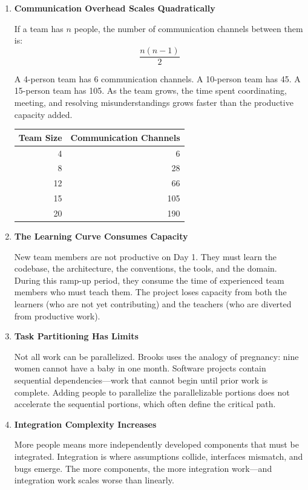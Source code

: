 \documentclass[11pt, letterpaper]{article}
\begin{document}
\begin{enumerate}
    \item \textbf{Communication Overhead Scales Quadratically}
    
    If a team has $n$ people, the number of communication channels between them is:
    \[
    \frac{n(n-1)}{2}
    \]
    
    A 4-person team has 6 communication channels. A 10-person team has 45. A 15-person team has 105. As the team grows, the time spent coordinating, meeting, and resolving misunderstandings grows faster than the productive capacity added.
    
    \begin{center}
    \begin{tabular}{rr}
    \toprule
    \textbf{Team Size} & \textbf{Communication Channels} \\
    \midrule
    4 & 6 \\
    8 & 28 \\
    12 & 66 \\
    15 & 105 \\
    20 & 190 \\
    \bottomrule
    \end{tabular}
    \end{center}
    
    \item \textbf{The Learning Curve Consumes Capacity}
    
    New team members are not productive on Day 1. They must learn the codebase, the architecture, the conventions, the tools, and the domain. During this ramp-up period, they consume the time of experienced team members who must teach them. The project loses capacity from both the learners (who are not yet contributing) and the teachers (who are diverted from productive work).
    
    \item \textbf{Task Partitioning Has Limits}
    
    Not all work can be parallelized. Brooks uses the analogy of pregnancy: nine women cannot have a baby in one month. Software projects contain sequential dependencies---work that cannot begin until prior work is complete. Adding people to parallelize the parallelizable portions does not accelerate the sequential portions, which often define the critical path.
    
    \item \textbf{Integration Complexity Increases}
    
    More people means more independently developed components that must be integrated. Integration is where assumptions collide, interfaces mismatch, and bugs emerge. The more components, the more integration work---and integration work scales worse than linearly.
\end{enumerate}
\end{document}
